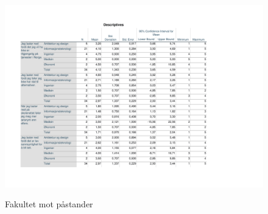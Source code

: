 \begin{figure}[H]
    \centering
    \includegraphics[scale=0.7]{case_1/bilder/DESCRIPTIVES_fakultet-pastand_LIGGENDE.pdf}
    \label{fig:DESCRIPTIVES_fakultet-påstand}
    \caption{Fakultet mot påstander}
\end{figure}


